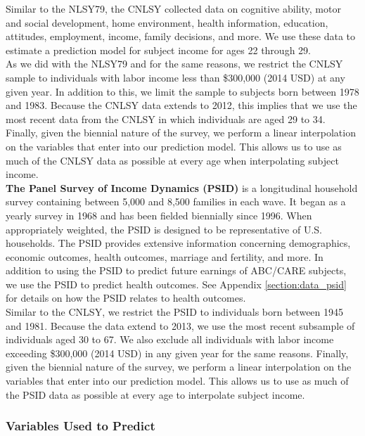 \noindent Similar to the NLSY79, the CNLSY collected data on cognitive ability, motor and social development, home environment, health information, education, attitudes, employment, income, family decisions, and more. We use these data to estimate a prediction model for subject income for ages 22 through 29. \\

\noindent As we did with the NLSY79 and for the same reasons, we restrict the CNLSY sample to individuals with labor income less than \$300,000 (2014 USD) at any given year. In addition to this, we limit the sample to subjects born between 1978 and 1983. Because the CNLSY data extends to 2012, this implies that we use the most recent data from the CNLSY in which individuals are aged 29 to 34. Finally, given the biennial nature of the survey, we perform a linear interpolation on the variables that enter into our prediction model. This allows us to use as much of the CNLSY data as possible at every age when interpolating subject income. \\

\noindent \textbf{The Panel Survey of Income Dynamics (PSID)} is a longitudinal household survey containing between 5,000 and 8,500 families in each wave. It began as a yearly survey in 1968 and has been fielded biennially since 1996. When appropriately weighted, the PSID is designed to be representative of U.S. households. The PSID provides extensive information concerning demographics, economic outcomes, health outcomes, marriage and fertility, and more. In addition to using the PSID to predict future earnings of ABC/CARE subjects, we use the PSID to predict health outcomes. See Appendix \ref{section:data_psid} for details on how the PSID relates to health outcomes. \\

\noindent Similar to the CNLSY, we restrict the PSID to individuals born between 1945 and 1981. Because the data extend to 2013, we use the most recent subsample of individuals aged 30 to 67. We also exclude all individuals with labor income exceeding \$300,000 (2014 USD) in any given year for the same reasons. Finally, given the biennial nature of the survey, we perform a linear interpolation on the variables that enter into our prediction model. This allows us to use as much of the PSID data as possible at every age to interpolate subject income. \\

\subsubsection{Variables Used to Predict}

